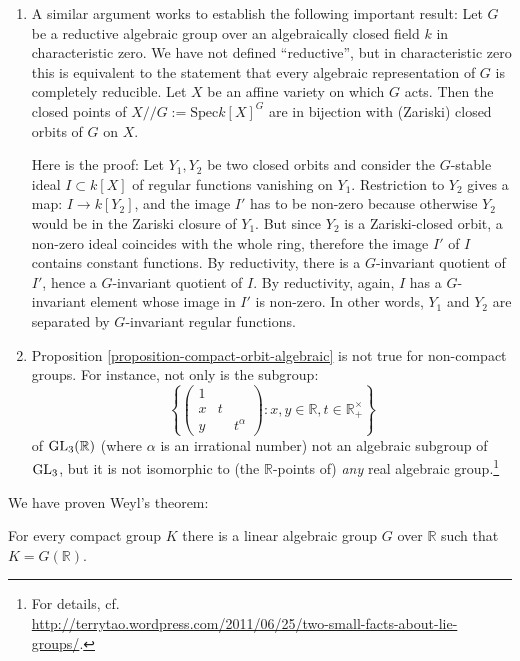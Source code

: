 \begin{remarks}
\label{remarks-compact-orbit-algebraic}
\begin{enumerate}
 \item A similar argument works to establish the following important result: Let $G$ be a reductive algebraic group over an algebraically closed field $k$ in characteristic zero. We have not defined ``reductive'', but in characteristic zero this is equivalent to the statement that every algebraic representation of $G$ is completely reducible. Let $X$ be an affine variety on which $G$ acts. Then the closed points of $X// G:=\text{Spec} k[X]^G$ are in bijection with (Zariski) closed orbits of $G$ on $X$.

Here is the proof: Let $Y_1, Y_2$ be two closed orbits and consider the $G$-stable ideal $I\subset k[X]$ of regular functions vanishing on $Y_1$. Restriction to $Y_2$ gives a map: $I\to k[Y_2]$, and the image $I'$ has to be non-zero because otherwise $Y_2$ would be in the Zariski closure of $Y_1$. But since $Y_2$ is a Zariski-closed orbit, a non-zero ideal coincides with the whole ring, therefore the image $I'$ of $I$ contains constant functions. By reductivity, there is a $G$-invariant quotient of $I'$, hence a $G$-invariant quotient of $I$. By reductivity, again, $I$ has a $G$-invariant element whose image in $I'$ is non-zero. In other words, $Y_1$ and $Y_2$ are separated by $G$-invariant regular functions.


\item Proposition \ref{proposition-compact-orbit-algebraic} is not true for non-compact groups. For instance, not only is the subgroup:
$$\left\{\left(\begin{array}{ccc} 1 \\ x & t \\ y && t^\alpha \end{array}\right): x,y\in \mathbb R, t\in \mathbb R_+^\times \right\}$$
of ${\rm GL}_3(\mathbb R)$ (where $\alpha$ is an irrational number) not an algebraic subgroup of ${\rm GL}_3$, but it is not isomorphic to (the $\mathbb R$-points of) \emph{any} real algebraic group.\footnote{For details, cf.\ \\ \url{http://terrytao.wordpress.com/2011/06/25/two-small-facts-about-lie-groups/}.}

\end{enumerate}

We have proven Weyl's theorem:

\begin{theorem}
\label{theorem-Weyl}
 For every compact group $K$ there is a linear algebraic group $G$ over $\mathbb R$ such that $K = G(\mathbb R)$.
\end{theorem}


\end{remarks}
